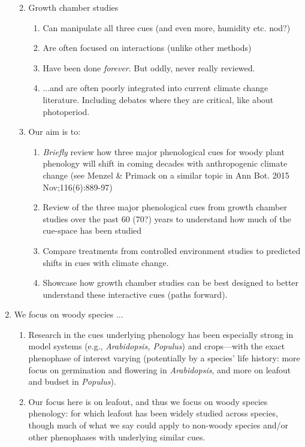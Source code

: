 \documentclass[11pt,letterpaper]{article}
\begin{document}
\begin{enumerate}
\begin{enumerate}
\begin{enumerate}
\end{enumerate}
\item Growth chamber studies
\begin{enumerate}
\item Can manipulate all three cues (and even more, humidity etc. nod?)
\item Are often focused on interactions (unlike other methods)
\item Have been done \emph{forever}. But oddly, never really reviewed.
\item  ...and are often poorly integrated into current climate change literature. Including debates where they are critical, like about photoperiod. 
\end{enumerate}
\item Our aim is to:
\begin{enumerate}
\item \emph{Briefly} review how three major phenological cues for woody plant phenology will shift in coming decades with anthropogenic climate change (see Menzel \& Primack on a similar topic in Ann Bot. 2015 Nov;116(6):889-97)
\item Review of the three major phenological cues from growth chamber studies over the past 60 (70?) years to understand how much of the cue-space has been studied
\item Compare treatments from controlled environment studies to predicted shifts in cues with climate change.  
\item Showcase how growth chamber studies can be best designed to better understand these interactive cues (paths forward). 
\end{enumerate}
\end{enumerate}
\item We focus on woody species ...
\begin{enumerate}
\item Research in the cues underlying phenology has been especially strong in model systems (e.g., \emph{Arabidopsis, Populus}) and crops---with the exact phenophase of interest varying (potentially by a species' life history: more focus on germination and flowering in \emph{Arabidopsis}, and more on leafout and budset in \emph{Populus}).
\item Our focus here is on leafout, and thus we focus on woody species phenology: for which leafout has been widely studied across species, though much of what we say could apply to non-woody species and/or other phenophases with underlying similar cues. 

\end{enumerate}
\end{enumerate}
\end{document}
